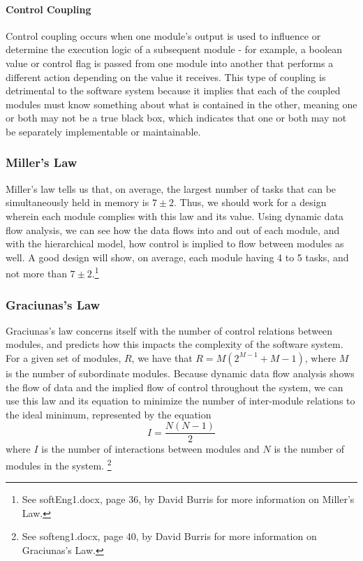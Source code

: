 \documentclass{article}
\begin{document}
			\paragraph{Control Coupling}
				Control coupling occurs when one module's output is used to influence or determine the execution logic of a subsequent module - for example, a boolean value or control flag is passed from one module into another that performs a different action depending on the value it receives. This type of coupling is detrimental to the software system because it implies that each of the coupled modules must know something about what is contained in the other, meaning one or both may not be a true black box, which indicates that one or both may not be separately implementable or maintainable. 
		\subsubsection{Miller's Law}
			Miller's law tells us that, on average, the largest number of tasks that can be simultaneously held in memory is $7\pm2$. Thus, we should work for a design wherein each module complies with this law and its value. Using dynamic data flow analysis, we can see how the data flows into and out of each module, and with the hierarchical model, how control is implied to flow between modules as well. A good design will show, on average, each module having 4 to 5 tasks, and not more than $7\pm2$.\footnote{See softEng1.docx, page 36, by David Burris for more information on Miller's Law.}  
		\subsubsection{Graciunas's Law}
			Graciunas's law concerns itself with the number of control relations between modules, and predicts how this impacts the complexity of the software system. For a given set of modules, $R$, we have that $R = M(2^{M-1} + M - 1)$, where $M$ is the number of subordinate modules. Because dynamic data flow analysis shows the flow of data and the implied flow of control throughout the system, we can use this law and its equation to minimize the number of inter-module relations to the ideal minimum, represented by the equation 
			$$I = \frac{N(N - 1)}{2}$$
			where $I$ is the number of interactions between modules and $N$ is the number of modules in the system. \footnote{See softeng1.docx, page 40, by David Burris for more information on Graciunas's Law.}
\end{document}
